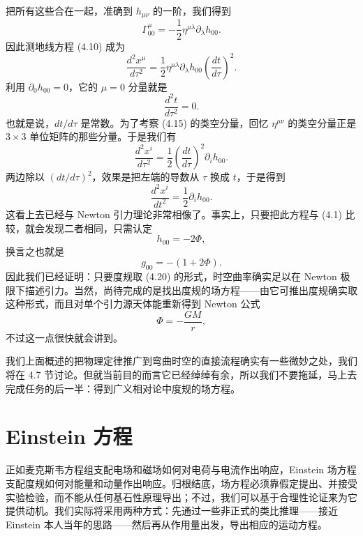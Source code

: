 把所有这些合在一起，准确到 $h_{\mu\nu}$ 的一阶，我们得到
\begin{equation*}
\Gamma^\mu_{00} = -\frac{1}{2}\eta^{\mu\lambda}\partial_\lambda h_{00}.
\tag{4.14}
\end{equation*}
因此测地线方程 (4.10) 成为
\begin{equation*}
\frac{d^2x^\mu}{d\tau^2} = \frac{1}{2}\eta^{\mu\lambda}\partial_\lambda h_{00}\left(\frac{dt}{d\tau}\right)^2.
\tag{4.15}
\end{equation*}
利用 $\partial_0 h_{00}=0$，它的 $\mu=0$ 分量就是
\begin{equation*}
\frac{d^2t}{d\tau^2} = 0.
\tag{4.16}
\end{equation*}
也就是说，$dt/d\tau$ 是常数。为了考察 (4.15) 的类空分量，回忆 $\eta^{\mu\nu}$ 的类空分量正是 $3\times 3$ 单位矩阵的那些分量。于是我们有
\begin{equation*}
\frac{d^2x^i}{d\tau^2} = \frac{1}{2}\left(\frac{dt}{d\tau}\right)^2\partial_i h_{00}.
\tag{4.17}
\end{equation*}
两边除以 $(dt/d\tau)^2$，效果是把左端的导数从 $\tau$ 换成 $t$，于是得到
\begin{equation*}
\frac{d^2x^i}{dt^2} = \frac{1}{2}\partial_i h_{00}.
\tag{4.18}
\end{equation*}
这看上去已经与 Newton 引力理论非常相像了。事实上，只要把此方程与 (4.1) 比较，就会发现二者相同，只需认定
\begin{equation*}
h_{00} = -2\Phi,
\tag{4.19}
\end{equation*}
换言之也就是
\begin{equation*}
g_{00} = -(1+2\Phi).
\tag{4.20}
\end{equation*}
因此我们已经证明：只要度规取 (4.20) 的形式，时空曲率确实足以在 Newton 极限下描述引力。当然，尚待完成的是找出度规的场方程——由它可推出度规确实取这种形式，而且对单个引力源天体能重新得到 Newton 公式
\begin{equation*}
\Phi = -\frac{GM}{r},
\tag{4.21}
\end{equation*}
不过这一点很快就会讲到。

我们上面概述的把物理定律推广到弯曲时空的直接流程确实有一些微妙之处，我们将在 4.7 节讨论。但就当前目的而言它已经绰绰有余，所以我们不要拖延，马上去完成任务的后一半：得到广义相对论中度规的场方程。

\section{Einstein 方程}

正如麦克斯韦方程组支配电场和磁场如何对电荷与电流作出响应，Einstein 场方程支配度规如何对能量和动量作出响应。归根结底，场方程必须靠假定提出、并接受实验检验，而不能从任何基石性原理导出；不过，我们可以基于合理性论证来为它提供动机。我们实际将采用两种方式：先通过一些非正式的类比推理——接近 Einstein 本人当年的思路——然后再从作用量出发，导出相应的运动方程。

